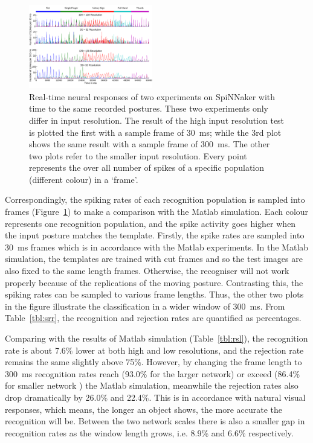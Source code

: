 \documentclass[journal]{journal}
\begin{document}
\begin{figure}
\centering
	\includegraphics[width=0.48\textwidth]{pics/rateSpiNN.pdf}
	\caption{Real-time neural responses of two experiments on SpiNNaker with time to the same recorded postures.
	These two experiments only differ in input resolution.
	The result of the high input resolution test is plotted the first with a sample frame of 30~ms; 
	while the 3rd plot shows the same result with a sample frame of 300~ms.
	The other two plots refer to the smaller input resolution.
	Every point represents the over all number of spikes of a specific population (different colour) in a `frame'.
	}
	\label{fig:spikerec}
\end{figure}

Correspondingly, the spiking rates of each recognition population is sampled into frames (Figure~\ref{fig:spikerec}) to make a comparison with the Matlab simulation. 
Each colour represents one recognition population, and the spike activity goes higher when the input posture matches the template. 
Firstly, the spike rates are sampled into 30~ms frames which is in accordance with the Matlab experiments.
In the Matlab simulation, the templates are trained with cut frames and so the test images are also fixed to the same length frames.
Otherwise, the recogniser will not work properly because of the replications of the moving posture.
Contrasting this, the spiking rates can be sampled to various frame lengths.
Thus, the other two plots in the figure illustrate the classification in a wider window of 300~ms.
From Table~\ref{tbl:srr}, the recognition and rejection rates are quantified as percentages.

Comparing with the results of Matlab simulation (Table~\ref{tbl:rsl}), the recognition rate is about 7.6\% lower at both high and low resolutions, and the rejection rate remains the same slightly above 75\%. 
However, by changing the frame length to 300~ms recognition rates reach (93.0\% for the larger network) or exceed (86.4\% for smaller network ) the Matlab simulation, meanwhile the rejection rates also drop dramatically by 26.0\% and 22.4\%.
This is in accordance with natural visual responses, which means, the longer an object shows, the more accurate the recognition will be.
Between the two network scales there is also a smaller gap in recognition rates as the window length grows, i.e. 8.9\% and 6.6\% respectively.
\end{document}
